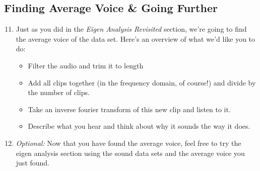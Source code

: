 \documentclass{tufte-handout}
\begin{document}
\subsection{Finding Average Voice \& Going Further}
\begin{enumerate}
	\setcounter{enumi}{10}
	\item Just as you did in the \textit{Eigen Analysis Revisited} section, we're going to find the average voice of the data set. Here's an overview of what we'd like you to do: \\ 
	\begin{itemize}
		\item Filter the audio and trim it to length
		\item Add all clips together (in the frequency domain, of course!) and divide by the number of clips. 
		\item Take an inverse fourier transform of this new clip and listen to it.
		\item Describe what you hear and think about why it sounds the way it does.
	\end{itemize}
\end{enumerate}

\begin{enumerate}
	\setcounter{enumi}{11}
	\item \textit{Optional:} Now that you have found the average voice, feel free to try the eigen analysis section using the sound data sets and the average voice you just found. 
\end{enumerate}
\end{document}

